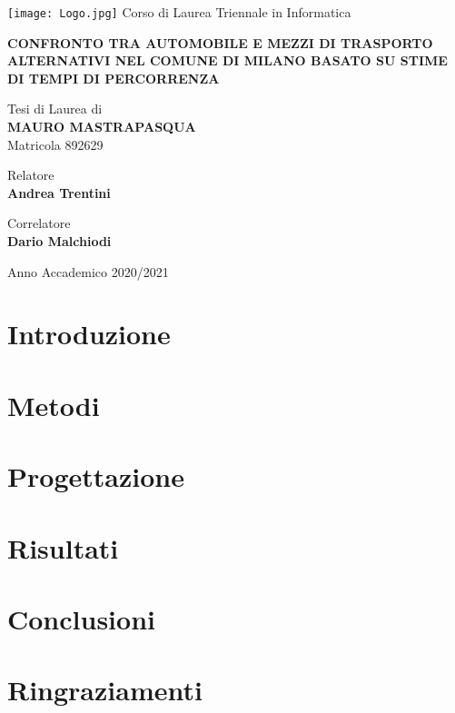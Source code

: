 \documentclass[a4paper,12pt]{report}
\begin{document}
\begin{titlepage}
	\begin{center}
		\texttt{[image: Logo.jpg]}
		\large{Corso di Laurea Triennale in Informatica}
		
		\vspace{1.8cm}
		
		\Large{\textbf{CONFRONTO TRA AUTOMOBILE E MEZZI DI TRASPORTO ALTERNATIVI NEL COMUNE DI MILANO BASATO SU STIME DI TEMPI DI PERCORRENZA}}
		
		\vspace{1.4cm}
		
		\large{Tesi di Laurea di} \\
		\large{\textbf{MAURO MASTRAPASQUA}} \\
		\large{Matricola 892629}
	\end{center}

	\begin{flushleft}
		\vspace{1.4cm}
		
		\normalsize{Relatore} \\
		\normalsize{\textbf{Andrea Trentini}}

		\vspace{0.4cm}

		\normalsize{Correlatore} \\
		\normalsize{\textbf{Dario Malchiodi}}
	\end{flushleft}

	\begin{center}
		\vspace{1.4cm}
		
		\large{Anno Accademico 2020/2021}
	\end{center}
\end{titlepage}

\tableofcontents
\listoftodos

\chapter{Introduzione}


\chapter{Metodi}


\chapter{Progettazione}


\chapter{Risultati}


\chapter{Conclusioni}


\chapter{Ringraziamenti}




\end{document}
